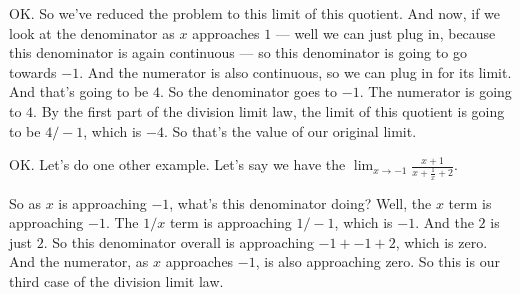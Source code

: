 \documentclass[pdftex, brazil, 12pt, twoside]{article}
\begin{document}
OK.
So we've reduced the problem to this limit of this quotient.
And now, if we look at the denominator as $x$ approaches $1$ ---
well we can just plug in, because this denominator
is again continuous --- so this denominator is
going to go towards $-1$.
And the numerator is also continuous,
so we can plug in for its limit.
And that's going to be $4$.
So the denominator goes to $-1$.
The numerator is going to $4$.
By the first part of the division limit law,
the limit of this quotient is going to be $4/-1$,
which is $-4$.
So that's the value of our original limit.

\begin{figure}[H]
  \begin{center}
  \end{center}
\end{figure}

OK.
Let's do one other example.
Let's say we have the $\displaystyle \lim_{x \to -1}\frac{x+1}{x+\frac{1}{x}+2}$.

\begin{figure}[H]
  \begin{center}
  \end{center}
\end{figure}

So as $x$ is approaching $-1$, what's this denominator doing?
Well, the $x$ term is approaching $-1$.
The $1/x$ term is approaching $1/-1$,
which is $-1$.
And the $2$ is just $2$.
So this denominator overall is approaching $-1 + -1 + 2$, which is zero.
And the numerator, as $x$ approaches $-1$,
is also approaching zero.
So this is our third case of the division limit law.
\end{document}
